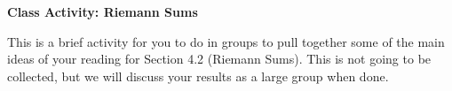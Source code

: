 \documentclass[11pt]{article}
\begin{document}
	
	\thispagestyle{empty}
	\renewcommand{\headrulewidth}{0.0pt}
	\thispagestyle{fancy}
	\lfoot{}
	\cfoot{}
	\rfoot{}	
	
	\vspace*{0in}

		\begin{center}
			\begin{large}
			\textbf{Class Activity: Riemann Sums} \\
			\end{large}
		\end{center}
		
This is a brief activity for you to do in groups to pull together some of the main ideas of your reading for Section 4.2 (Riemann Sums). This is not going to be collected, but we will discuss your results as a large group when done. 
\end{document}
